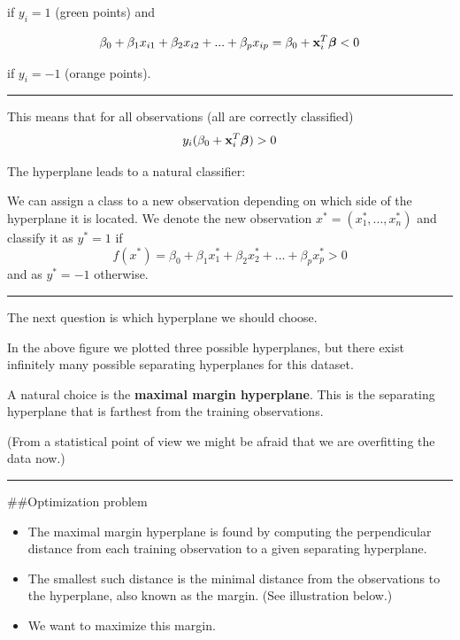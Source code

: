 \documentclass[]{article}
\providecommand{\tightlist}{%
  \setlength{\itemsep}{0pt}\setlength{\parskip}{0pt}}
\begin{document}
if \(y_i=1\) (green points) and

\[\beta_0+\beta_1 x_{i1} + \beta_2 x_{i2}+...+\beta_p x_{ip}=\beta_0+{\bf x}_i^T {\boldsymbol \beta}<0\]

if \(y_i=-1\) (orange points).

\begin{center}\rule{0.5\linewidth}{\linethickness}\end{center}

This means that for all observations (all are correctly classified)
\[y_i (\beta_0+{\bf x}_i^T {\boldsymbol \beta})>0\]

The hyperplane leads to a natural classifier:

We can assign a class to a new observation depending on which side of
the hyperplane it is located. We denote the new observation
\(x^*=(x_1^*,...,x_n^*)\) and classify it as \(y^*=1\) if
\[f(x^*)=\beta_0+\beta_1 x_1^* + \beta_2 x_{2}^*+...+\beta_p x_{p}^*>0\]
and as \(y^*=-1\) otherwise.

\begin{center}\rule{0.5\linewidth}{\linethickness}\end{center}

The next question is which hyperplane we should choose.

In the above figure we plotted three possible hyperplanes, but there
exist infinitely many possible separating hyperplanes for this dataset.

A natural choice is the \textbf{maximal margin hyperplane}. This is the
separating hyperplane that is farthest from the training observations.

(From a statistical point of view we might be afraid that we are
overfitting the data now.)

\begin{center}\rule{0.5\linewidth}{\linethickness}\end{center}

\#\#Optimization problem

\begin{itemize}
\tightlist
\item
  The maximal margin hyperplane is found by computing the perpendicular
  distance from each training observation to a given separating
  hyperplane.
\item
  The smallest such distance is the minimal distance from the
  observations to the hyperplane, also known as the margin. (See
  illustration below.)
\item
  We want to maximize this margin.
\end{itemize}
\end{document}
